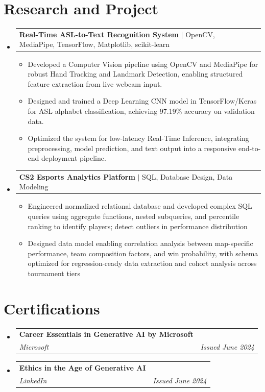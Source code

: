 \documentclass[letterpaper,11pt]{article}
\makeatletter
\newcommand{\resumeItem}[1]{
  \item\small{
    {#1 \vspace{-2pt}}
  }
}
\newcommand{\resumeSubheading}[4]{
  \vspace{-2pt}\item
    \begin{tabular*}{0.97\textwidth}[t]{l@{\extracolsep{\fill}}r}
      \textbf{#1} & #2 \\
      \textit{\small#3} & \textit{\small #4} \\
    \end{tabular*}\vspace{-7pt}
}
\newcommand{\resumeProjectHeading}[2]{
    \vspace{-2pt}\item
    \begin{tabular*}{0.97\textwidth}{l@{\extracolsep{\fill}}r}
      \small#1 & #2 \\
    \end{tabular*}\vspace{-7pt}
}
\newcommand{\resumeSubHeadingListStart}{\begin{itemize}[leftmargin=0.1in, label={}]}
\newcommand{\resumeSubHeadingListEnd}{\end{itemize}}
\newcommand{\resumeItemListStart}{\begin{itemize}}
\newcommand{\resumeItemListEnd}{\end{itemize}\vspace{-5pt}}
\makeatother
\begin{document}
\section{Research and Project}
\resumeSubHeadingListStart

  \resumeProjectHeading
    {\textbf{Real-Time ASL-to-Text Recognition System} $|$ OpenCV, MediaPipe, TensorFlow, Matplotlib, scikit-learn}{}
    \resumeItemListStart
      \resumeItem{Developed a Computer Vision pipeline using OpenCV and MediaPipe for robust Hand Tracking and Landmark Detection, enabling structured feature extraction from live webcam input.}
      \resumeItem{Designed and trained a Deep Learning CNN model in TensorFlow/Keras for ASL alphabet classification, achieving 97.19\% accuracy on validation data.}
      \resumeItem{Optimized the system for low-latency Real-Time Inference, integrating preprocessing, model prediction, and text output into a responsive end-to-end deployment pipeline.}
    \resumeItemListEnd

  \resumeProjectHeading
    {\textbf{CS2 Esports Analytics Platform} $|$ SQL, Database Design, Data Modeling}{}
    \resumeItemListStart
      \resumeItem{Engineered normalized relational database and developed complex SQL queries using aggregate functions, nested subqueries, and percentile ranking to identify players; detect outliers in performance distribution}
      \resumeItem{Designed data model enabling correlation analysis between map-specific performance, team composition factors, and win probability, with schema optimized for regression-ready data extraction and cohort analysis across tournament tiers}
    \resumeItemListEnd

\resumeSubHeadingListEnd

\section{Certifications}
  \resumeSubHeadingListStart
    \resumeSubheading
      {Career Essentials in Generative AI by Microsoft}{}
      {Microsoft}{Issued June 2024}
      
    \resumeSubheading
      {Ethics in the Age of Generative AI}{}
      {LinkedIn} {Issued June 2024}
  \resumeSubHeadingListEnd
\end{document}
